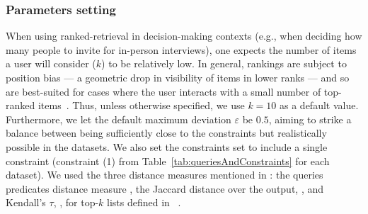 \subsubsection*{Parameters setting} When using ranked-retrieval in decision-making contexts (e.g., when deciding how many people to invite for in-person interviews), one expects the number of items a user will consider ($k$) to be relatively low. In general, rankings are subject to position bias --- a geometric drop in visibility of items in lower ranks --- and so are best-suited for cases where the user interacts with a small number of top-ranked items~\cite{DBLP:journals/cacm/Baeza-Yates18}.
Thus, unless otherwise specified, we use $k=10$ as a default value. Furthermore, we let the default maximum deviation $\varepsilon$ be $0.5$, aiming to strike a balance between being sufficiently close to the constraints but realistically possible in the datasets.  We also set the constraints set to include a single constraint (constraint (1) from Table~\ref{tab:queriesAndConstraints} for each dataset). We used the three distance measures mentioned in : the queries predicates distance measure , the Jaccard distance over the output, , and Kendall's $\tau$, , for top-$k$ lists defined in~\cite{FKS03} . 






